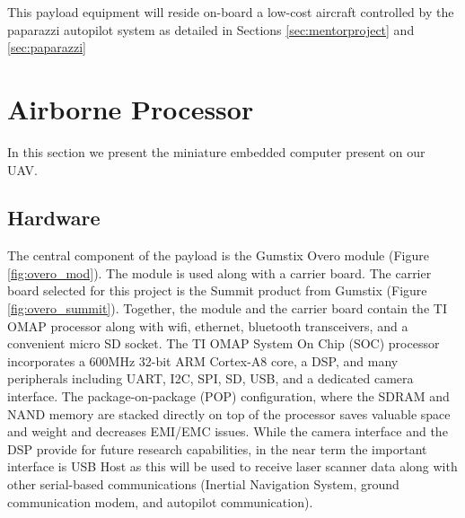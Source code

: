 \documentclass[a4paper,11pt]{report}
\begin{document}
\begin{figure}[htb]
  \centering
  \caption{}
  \label{fig:sensors}
\end{figure}

This payload equipment will reside on-board a low-cost aircraft controlled by the paparazzi autopilot system as detailed in Sections \ref{sec:mentorproject} and \ref{sec:paparazzi}

\section{Airborne Processor}
\label{sec:AirborneProcessor}

In this section we present the miniature embedded computer present on our UAV.

\subsection{Hardware}

The central component of the payload is the Gumstix Overo module (Figure \ref{fig:overo_mod}). The module is used along with a carrier board. The carrier board selected for this project is the Summit product from Gumstix (Figure \ref{fig:overo_summit}). Together, the module and the carrier board contain the TI OMAP processor along with wifi, ethernet, bluetooth transceivers, and a convenient micro SD socket. The TI OMAP System On Chip (SOC) processor incorporates a 600MHz 32-bit ARM Cortex-A8 core, a DSP, and many peripherals including UART, I2C, SPI, SD, USB, and a dedicated camera interface. The package-on-package (POP) configuration, where the SDRAM and NAND memory are stacked directly on top of the processor saves valuable space and weight and decreases EMI/EMC issues. While the camera interface and the DSP provide for future research capabilities, in the near term the important interface is USB Host as this will be used to receive laser scanner data along with other serial-based communications (Inertial Navigation System, ground communication modem, and autopilot communication).
\end{document}
